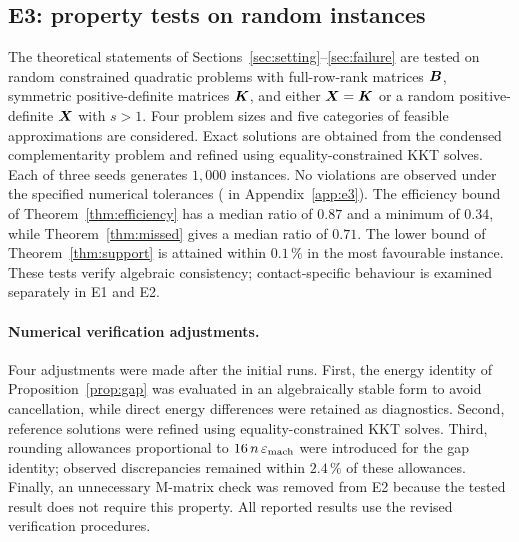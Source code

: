 \subsection{E3: property tests on random instances}\label{sec:e3}
The theoretical statements of Sections~\ref{sec:setting}--\ref{sec:failure} are tested on random constrained quadratic problems with full-row-rank
matrices $\boldsymbol{B}$, symmetric positive-definite matrices $\boldsymbol{K}$, and either $\boldsymbol{X}=\boldsymbol{K}$ or a random positive-definite $\boldsymbol{X}$ with $s>1$. Four problem
sizes and five categories of feasible approximations are considered. Exact solutions are obtained from the condensed complementarity problem and
refined using equality-constrained KKT solves. Each of three seeds generates $1,000$ instances. No violations are observed under the specified
numerical tolerances ( in Appendix~\ref{app:e3}). The efficiency bound of Theorem~\ref{thm:efficiency} has a median ratio of
$0.87$ and a minimum of $0.34$, while Theorem~\ref{thm:missed} gives a median ratio of $0.71$. The lower bound of Theorem~\ref{thm:support}
is attained within $0.1\,\%$ in the most favourable instance. These tests verify algebraic consistency; contact-specific behaviour is examined
separately in E1 and E2.

\paragraph{Numerical verification adjustments.}
Four adjustments were made after the initial runs. First, the energy identity of Proposition~\ref{prop:gap} was evaluated in an algebraically
stable form to avoid cancellation, while direct energy differences were retained as diagnostics. Second, reference solutions were refined using
equality-constrained KKT solves. Third, rounding allowances proportional to $16\,n\,\varepsilon_{\rm mach}$ were introduced for the gap identity;
observed discrepancies remained within $2.4\,\%$ of these allowances. Finally, an unnecessary M-matrix check was removed from E2 because the
tested result does not require this property. All reported results use the revised verification procedures.
